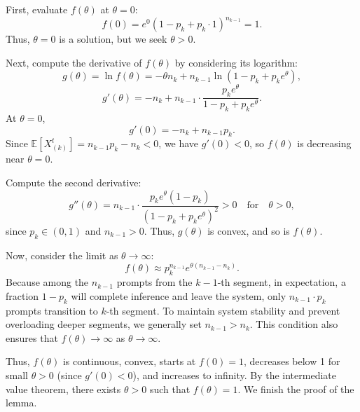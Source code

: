 First, evaluate \(f(\theta)\) at \(\theta = 0\):
\[
f(0) = e^{0} (1 - p_k + p_k \cdot 1)^{n_{k-1}} = 1.
\]
Thus, \(\theta = 0\) is a solution, but we seek \(\theta > 0\).

Next, compute the derivative of \(f(\theta)\) by considering its logarithm:
\[
g(\theta) = \ln f(\theta) = -\theta n_{k} + n_{k-1} \ln(1 - p_k + p_k e^{\theta}),
\]
\[
g'(\theta) = -n_{k} + n_{k-1} \cdot \frac{p_k e^{\theta}}{1 - p_k + p_k e^{\theta}}.
\]
At \(\theta = 0\),
\[
g'(0) = -n_{k} + n_{k-1} p_k.
\]
Since \(\mathbb{E}[X^t_{(k)}] = n_{k-1} p_k - n_{k} < 0\), we have \(g'(0) < 0\), so \(f(\theta)\) is decreasing near \(\theta = 0\).

Compute the second derivative:
\[
g''(\theta) = n_{k-1} \cdot \frac{p_k e^{\theta} (1 - p_k)}{(1 - p_k + p_k e^{\theta})^2} > 0 \quad \text{for} \quad \theta > 0,
\]
since \(p_k \in (0, 1)\) and \(n_{k-1} > 0\). Thus, \(g(\theta)\) is convex, and so is \(f(\theta)\).

Now, consider the limit as \(\theta \to \infty\):
\[
f(\theta) \approx p_k^{n_{k-1}} e^{\theta (n_{k-1} - n_{k})}.
\]
Because among the $n_{k-1}$ prompts from the $k-1$-th segment, in expectation, a fraction $1-p_k$ will complete inference and leave the system, only $n_{k-1}\cdot p_k$ prompts transition to $k$-th segment. To maintain system stability and prevent overloading deeper segments, we generally set $n_{k-1}>n_{k}$. This condition also ensures that \(f(\theta) \to \infty\) as \(\theta \to \infty\).

Thus, \(f(\theta)\) is continuous, convex, starts at \(f(0) = 1\), decreases below 1 for small \(\theta > 0\) (since \(g'(0) < 0\)), and increases to infinity. By the intermediate value theorem, there exists \(\theta > 0\) such that \(f(\theta) = 1\). We finish the proof of the lemma.

